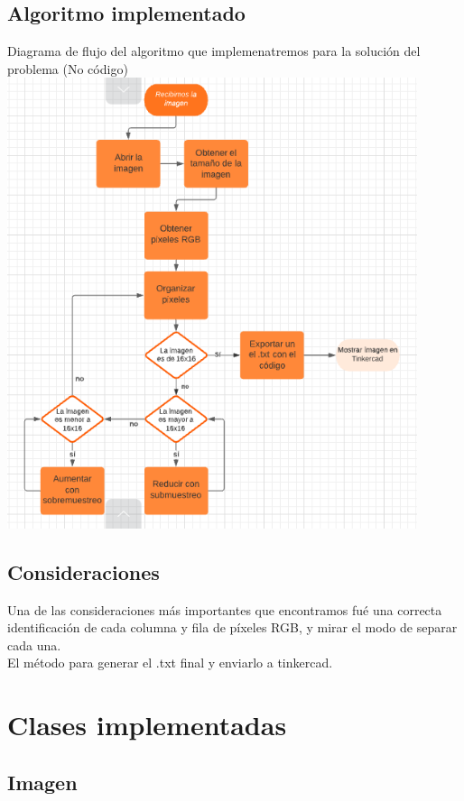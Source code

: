\documentclass{article}
\begin{document}
\subsection{Algoritmo implementado}
Diagrama de flujo del algoritmo que implemenatremos para la solución del problema (No código)\\
\includegraphics[width=12cm]{Imagenes/Algo.png}

\subsection{Consideraciones}
Una de las consideraciones más importantes que encontramos fué una correcta identificación de cada columna y fila de píxeles RGB, y mirar el modo de separar cada una.\\
El método para generar el .txt final y enviarlo a tinkercad.\\



\section{Clases implementadas}
\subsection{Imagen}
\end{document}

